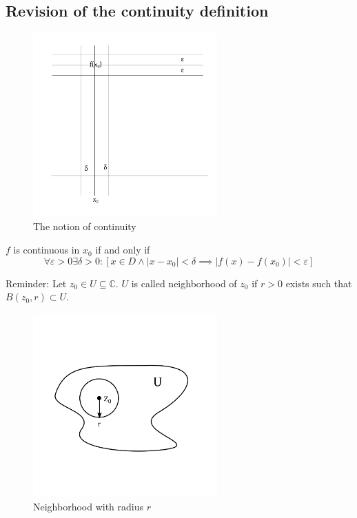 \documentclass[a4paper,landscape,twocolumn]{article}
\theoremstyle{definition}
\newcommand\abs[1]{\left|#1\right|}
\begin{document}
\subsection{Revision of the continuity definition}

\begin{figure}[!h]
  \begin{center}
    \includegraphics[width=200pt]{img/continuity_revised.pdf}
    \caption{The notion of continuity}
  \end{center}
\end{figure}

$f$ is continuous in $x_0$ if and only if
\[
  \forall \varepsilon > 0 \exists \delta > 0:
  [x \in D \land \abs{x - x_0} < \delta \implies \abs{f(x) - f(x_0)} < \varepsilon]
\]

Reminder:
Let $z_0 \in U \subseteq \mathbb C$.
$U$ is called neighborhood of $z_0$ if $r > 0$ exists such that $B(z_0, r) \subset U$.

\begin{figure}[!h]
  \begin{center}
    \includegraphics[width=200pt]{img/environment.pdf}
    \caption{Neighborhood with radius $r$}
  \end{center}
\end{figure}
\end{document}

